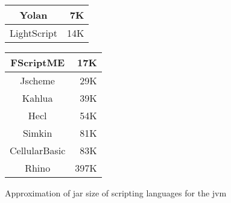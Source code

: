 \begin{figure}
\begin{center}
\begin{tabular}{|c|r|}
\hline 
Yolan & 7K \\
\hline 
LightScript & 14K \\
\hline 
\end{tabular}
\begin{tabular}{|c|r|}
\hline 
FScriptME & 17K \\
\hline 
Jscheme & 29K \\
\hline 
Kahlua & 39K \\
\hline 
Hecl & 54K \\
\hline 
Simkin & 81K \\
\hline 
CellularBasic & 83K \\
\hline 
Rhino & 397K \\
\hline 
\end{tabular}
\end{center}
\caption{Approximation of jar size of scripting languages for the jvm}
\end{figure}
